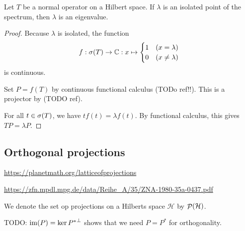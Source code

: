 \begin{proposition}
Let $T$ be a normal operator on a Hilbert space. If $\lambda$ is an isolated point of the spectrum, then $\lambda$ is an eigenvalue.
\end{proposition}
\begin{proof}
Because $\lambda$ is isolated, the function
\[ f: \sigma(T)\to \mathbb{C}: x\mapsto \begin{cases}
1 & (x=\lambda) \\
0 & (x\neq \lambda)
\end{cases} \]
is continuous.

Set $P = f(T)$ by continuous functional calculus (TODo ref!!). This is a projector by (TODO ref).

For all $t\in \sigma(T)$, we have $tf(t) = \lambda f(t)$. By functional calculus, this gives $TP = \lambda P$.
\end{proof}


\subsection{Orthogonal projections}
\url{https://planetmath.org/latticeofprojections}

\url{https://zfn.mpdl.mpg.de/data/Reihe_A/35/ZNA-1980-35a-0437.pdf}

We denote the set op projections on a Hilberts space $\mathcal{H}$ by $\mathop{\mathcal{P}}\nolimits(\mathcal{H})$.

TODO: $\operatorname{im}(P) = \ker{P^*}^\perp$ shows that we need $P= P^*$ for orthogonality.

